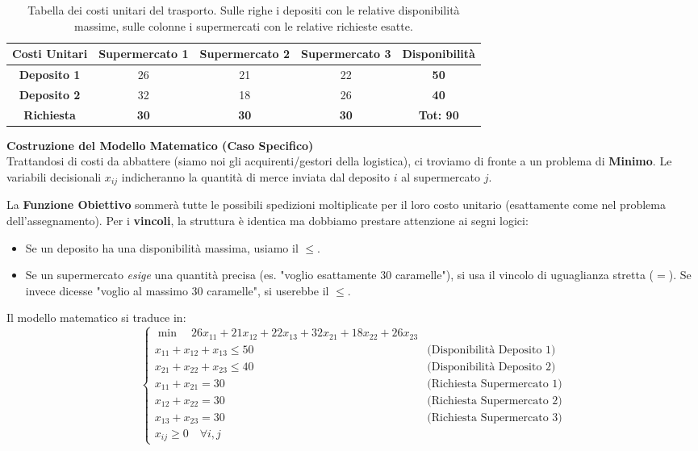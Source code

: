 \documentclass[12pt, a4paper]{article}
\renewcommand{\arraystretch}{1.25}
\begin{document}
	\begin{table}[H]
		\centering
		\renewcommand{\arraystretch}{1.3}
		\begin{tabular}{|c|c|c|c||c|}
			\hline
			\textbf{Costi Unitari} & \textbf{Supermercato 1} & \textbf{Supermercato 2} & \textbf{Supermercato 3} & \textbf{Disponibilità} \\ \hline
			\textbf{Deposito 1} & 26 & 21 & 22 & \textbf{50} \\ \hline
			\textbf{Deposito 2} & 32 & 18 & 26 & \textbf{40} \\ \hline\hline
			\textbf{Richiesta} & \textbf{30} & \textbf{30} & \textbf{30} & \textbf{Tot: 90} \\ \hline
		\end{tabular}
		\caption{Tabella dei costi unitari del trasporto. Sulle righe i depositi con le relative disponibilità massime, sulle colonne i supermercati con le relative richieste esatte.}
	\end{table}
	
	\textbf{Costruzione del Modello Matematico (Caso Specifico)}\\
	Trattandosi di costi da abbattere (siamo noi gli acquirenti/gestori della logistica), ci troviamo di fronte a un problema di \textbf{Minimo}. Le variabili decisionali $x_{ij}$ indicheranno la quantità di merce inviata dal deposito $i$ al supermercato $j$.
	
	La \textbf{Funzione Obiettivo} sommerà tutte le possibili spedizioni moltiplicate per il loro costo unitario (esattamente come nel problema dell'assegnamento).
	Per i \textbf{vincoli}, la struttura è identica ma dobbiamo prestare attenzione ai segni logici:
	\begin{itemize}[label=$\circ$, itemsep=2pt, leftmargin=1.5cm]
		\item Se un deposito ha una disponibilità massima, usiamo il $\leq$.
		\item Se un supermercato \textit{esige} una quantità precisa (es. "voglio esattamente 30 caramelle"), si usa il vincolo di uguaglianza stretta ($=$). Se invece dicesse "voglio al massimo 30 caramelle", si userebbe il $\leq$.
	\end{itemize}
	
	Il modello matematico si traduce in:
	\[
	\begin{cases}
		\min \quad 26x_{11} + 21x_{12} + 22x_{13} + 32x_{21} + 18x_{22} + 26x_{23} \\
		x_{11} + x_{12} + x_{13} \leq 50 \quad &\text{(Disponibilità Deposito 1)} \\
		x_{21} + x_{22} + x_{23} \leq 40 \quad &\text{(Disponibilità Deposito 2)} \\
		x_{11} + x_{21} = 30 \quad &\text{(Richiesta Supermercato 1)} \\
		x_{12} + x_{22} = 30 \quad &\text{(Richiesta Supermercato 2)} \\
		x_{13} + x_{23} = 30 \quad &\text{(Richiesta Supermercato 3)} \\
		x_{ij} \geq 0 \quad \forall i,j
	\end{cases}
	\]
	
\end{document}
